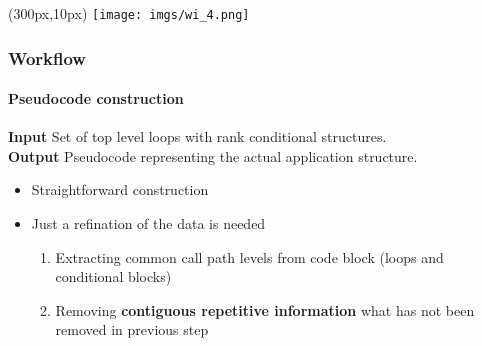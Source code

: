 \documentclass{beamer}
\begin{document}
\begin{frame}
\begin{textblock*}{5cm}(300px,10px) %
	\texttt{[image: imgs/wi\_4.png]}
\end{textblock*}
\frametitle{Workflow}
\framesubtitle{Pseudocode construction}
\begin{mdframed}[backgroundcolor=black!10,roundcorner=5pt,linewidth=0pt]
\textbf{Input} Set of top level loops with rank conditional structures.\\
\textbf{Output} Pseudocode representing the actual application structure.
\end{mdframed}
\vfill
\pause
\begin{itemize}
	\item Straightforward construction
	\item Just a refination of the data is needed
	\begin{enumerate}
		\item Extracting common call path levels from code block (loops and conditional blocks)
		\item Removing \textbf{contiguous repetitive information} what has not been removed in previous step
	\end{enumerate}
\end{itemize}
\end{frame}

\end{document}
